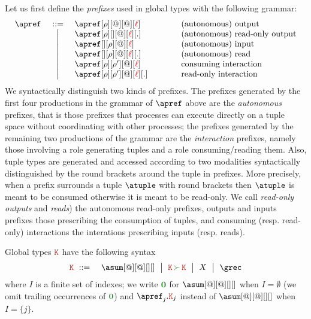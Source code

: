 %
Let us first define the \emph{prefixes} used in global types
with the following grammar:
%
\[\begin{array}{lcl@{\qquad\qquad}l}
  \apref & \bnfdef
  & \apref[\arole][@][@][\alocvar] & \text{(autonomous) output}
  \\ & \bnfmid
  & \apref[\arole][{}][@][\alocvar][.] & \text{(autonomous) read-only output}
  \\ & \bnfmid
  & \apref[{}][\arole][@][\alocvar] & \text{(autonomous) input}
  \\ & \bnfmid
  & \apref[{}][\arole][@][\alocvar][.] & \text{(autonomous) read}
  \\ & \bnfmid
  & \apref[\arole][\arole'][@][\alocvar] & \text{consuming interaction}
  \\ & \bnfmid
  & \apref[\arole][\arole'][@][\alocvar][.]  & \text{read-only interaction}
  \end{array}
\]
%
We syntactically distinguish two kinds of prefixes.
%
The prefixes generated by the first four productions in the grammar of
$\apref$ above are the \emph{autonomous} prefixes, that is those
prefixes that processes can execute directly on a tuple space without
coordinating with other processes; the prefixes generated by the
remaining two productions of the grammar are the \emph{interaction}
prefixes, namely those involving a role generating tuples and a role
consuming/reading them.
%
Also, tuple types are generated and accessed according to two
modalities syntactically distinguished by the round brackets around
the tuple in prefixes.
%
More precisely, when a prefix surrounds a tuple $\atuple$ with round
brackets then $\atuple$ is meant to be consumed otherwise it is meant
to be read-only.
%
We call \emph{read-only outputs} and \emph{reads}) the autonomous
read-only prefixes, outputs and inputs prefixes those prescribing the
consumption of tuples, and consuming (resp. read-only) interactions
the interations prescribing inputs (resp. reads).

Global types $\aK$ have the following syntax
\begin{eqnarray*}
  \aK & \bnfdef & \asum[@][@][][]
                  \bnfmid
                  \aK \seqop \aK \bnfmid
                  X \bnfmid
                  \grec
\end{eqnarray*}
where $I$ is a finite set of indexes; we write $\nil$ for
$\asum[@][@][][]$ when $I = \emptyset$ (we omit trailing occurrences
of $\nil$) and $\apref_j.\aK_j$ instead of $\asum[@][@][][]$ when
$I = \{j\}$.

